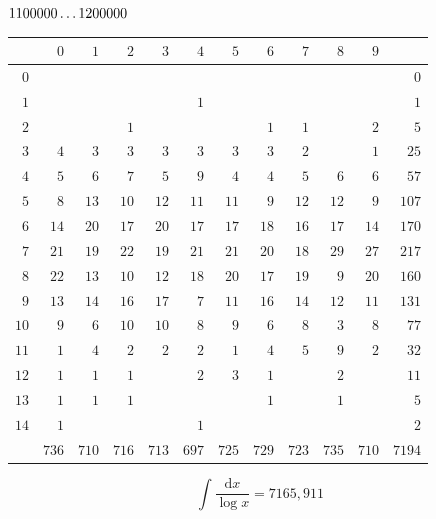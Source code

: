 \par\medskip
\noindent\begin{minipage}{\linewidth}\centering
{}
\(1100000\mathinner{.\,.\,.}1200000\)\par\smallskip
\begingroup\fontsize{10.5}{11.5}\selectfont\setlength{\tabcolsep}{3.5pt}\renewcommand{\arraystretch}{1}
\begin{tabular}{r|rrrrrrrrrr|r}\hline
 & $0$ & $1$ & $2$ & $3$ & $4$ & $5$ & $6$ & $7$ & $8$ & $9$ &  \\ \hline
$0$ &  &  &  &  &  &  &  &  &  &  & $0$ \\
$1$ &  &  &  &  & $1$ &  &  &  &  &  & $1$ \\
$2$ &  &  & $1$ &  &  &  & $1$ & $1$ &  & $2$ & $5$ \\
$3$ & $4$ & $3$ & $3$ & $3$ & $3$ & $3$ & $3$ & $2$ &  & $1$ & $25$ \\
$4$ & $5$ & $6$ & $7$ & $5$ & $9$ & $4$ & $4$ & $5$ & $6$ & $6$ & $57$ \\
$5$ & $8$ & $13$ & $10$ & $12$ & $11$ & $11$ & $9$ & $12$ & $12$ & $9$ & $107$ \\
$6$ & $14$ & $20$ & $17$ & $20$ & $17$ & $17$ & $18$ & $16$ & $17$ & $14$ & $170$ \\
$7$ & $21$ & $19$ & $22$ & $19$ & $21$ & $21$ & $20$ & $18$ & $29$ & $27$ & $217$ \\
$8$ & $22$ & $13$ & $10$ & $12$ & $18$ & $20$ & $17$ & $19$ & $9$ & $20$ & $160$ \\
$9$ & $13$ & $14$ & $16$ & $17$ & $7$ & $11$ & $16$ & $14$ & $12$ & $11$ & $131$ \\
$10$ & $9$ & $6$ & $10$ & $10$ & $8$ & $9$ & $6$ & $8$ & $3$ & $8$ & $77$ \\
$11$ & $1$ & $4$ & $2$ & $2$ & $2$ & $1$ & $4$ & $5$ & $9$ & $2$ & $32$ \\
$12$ & $1$ & $1$ & $1$ &  & $2$ & $3$ & $1$ &  & $2$ &  & $11$ \\
$13$ & $1$ & $1$ & $1$ &  &  &  & $1$ &  & $1$ &  & $5$ \\
$14$ & $1$ &  &  &  & $1$ &  &  &  &  &  & $2$ \\
\hline
 & $736$ & $710$ & $716$ & $713$ & $697$ & $725$ & $729$ & $723$ & $735$ & $710$ & $7194$ \\ \hline
\end{tabular}\par\endgroup
\setlength{\abovedisplayskip}{6pt}\setlength{\belowdisplayskip}{4pt}
\[\int\frac{\mathrm{d}x}{\log x}=7165{,}911\]
\end{minipage}\par

